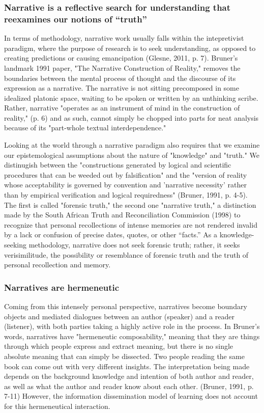\subsubsection{Narrative is a reflective search for understanding that reexamines our notions of “truth”}

In terms of methodology, narrative work usually falls within the intepretivist paradigm, where the purpose of research is to seek understanding, as opposed to creating predictions or causing emancipation (Glesne, 2011, p. 7). Bruner's landmark 1991 paper, "The Narrative Construction of Reality," removes the boundaries between the mental process of thought and the discourse of its expression as a narrative. The narrative is not sitting precomposed in some idealized platonic space, waiting to be spoken or written by an unthinking scribe. Rather, narrative "operates as an instrument of mind in the construction of reality," (p. 6) and as such, cannot simply be chopped into parts for neat analysis because of its "part-whole textual interdependence."

Looking at the world through a narrative paradigm also requires that we examine our epistemological assumptions about the nature of "knowledge" and "truth." We distinugish between the "constructions generated by logical and scientific procedures that can be weeded out by falsification" and the "version of reality whose acceptability is governed by convention and 'narrative necessity' rather than by empirical verification and logical requiredness" (Bruner, 1991, p. 4-5). The first is called "forensic truth," the second one "narrative truth," a distinction made by the South African Truth and Reconciliation Commission (1998) to recognize that personal recollections of intense memories are not rendered invalid by a lack or confusion of precise dates, quotes, or other “facts.” As a knowledge-seeking methodology, narrative does not seek forensic truth; rather, it seeks verisimilitude, the possibility or resemblance of forensic truth and the truth of personal recollection and memory.

\subsubsection{Narratives are hermeneutic}

Coming from this intensely personal perspective, narratives become boundary objects and mediated dialogues between an author (speaker) and a reader (listener), with both parties taking a highly active role in the process. In Bruner's words, narratives have "hermeneutic composability," meaning that they are things through which people express and extract meaning, but there is no single absolute meaning that can simply be dissected. Two people reading the same book can come out with very different insights. The interpretation being made depends on the background knowledge and intention of both author and reader, as well as what the author and reader know about each other. (Bruner, 1991, p. 7-11) However, the information dissemination model of learning does not account for this hermeneutical interaction.

